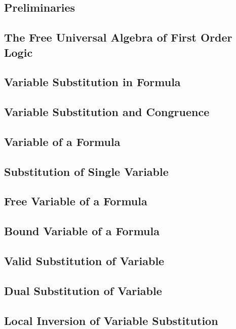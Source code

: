 \documentclass{report}
\begin{document}
    \subsection{Preliminaries}
      
    \subsection{The Free Universal Algebra of First Order Logic}
      
    \subsection{Variable Substitution in Formula}
      
    \subsection{Variable Substitution and Congruence}
      
    \subsection{Variable of a Formula}
      
    \subsection{Substitution of Single Variable}
      
    \subsection{Free Variable of a Formula}
      
    \subsection{Bound Variable of a Formula}
      
    \subsection{Valid Substitution of Variable}
      
    \subsection{Dual Substitution of Variable}
      
    \subsection{Local Inversion of Variable Substitution}
      
\end{document}

